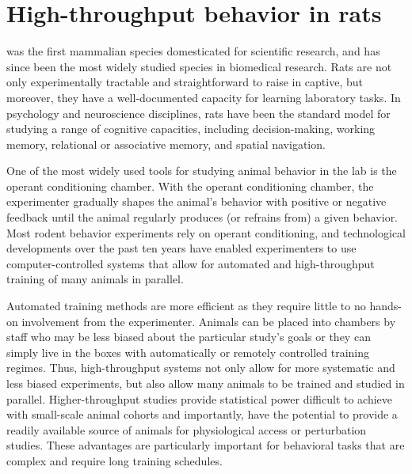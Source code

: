
\chapter{High-throughput behavior in rats}
 was the first mammalian species domesticated for scientific research\cite{Jacob1999}, and has since been the most widely studied species in biomedical research. Rats are not only experimentally tractable and straightforward to raise in captive, but moreover, they have a well-documented capacity for learning laboratory tasks. In psychology and neuroscience disciplines, rats have been the standard model for studying a range of cognitive capacities, including decision-making\cite{Raposo2012, Miller2017TwoStep, Piet2018, Brunton2013}, working memory\cite{Bratch2016, Fassihi2014, Akrami2018}, relational or associative memory\cite{Dusek1997, Abada2013ReversalDisease}, and spatial navigation\cite{OKeefe1971, Whishaw1995, Aronov2014, Poo2020}. 

One of the most widely used tools for studying animal behavior in the lab is the operant conditioning chamber. With the operant conditioning chamber, the experimenter gradually shapes the animal's behavior with positive or negative feedback until the animal regularly produces (or refrains from) a given behavior. Most rodent behavior experiments rely on operant conditioning, and technological developments over the past ten years have enabled experimenters to use computer-controlled systems that allow for automated and high-throughput training of many animals in parallel. 

Automated training methods are more efficient as they require little to no hands-on involvement from the experimenter. Animals can be placed into chambers by staff who may be less biased about the particular study's goals or they can simply live in the boxes with automatically or remotely controlled training regimes\cite{Qiao2018, Miller2017TwoStep, Poddar2013}. Thus, high-throughput systems not only allow for more systematic and less biased experiments, but also allow many animals to be trained and studied in parallel. Higher-throughput studies provide statistical power difficult to achieve with small-scale animal cohorts and importantly, have the potential to provide a readily available source of animals for physiological access or perturbation studies. These advantages are particularly important for behavioral tasks that are complex and require long training schedules.

